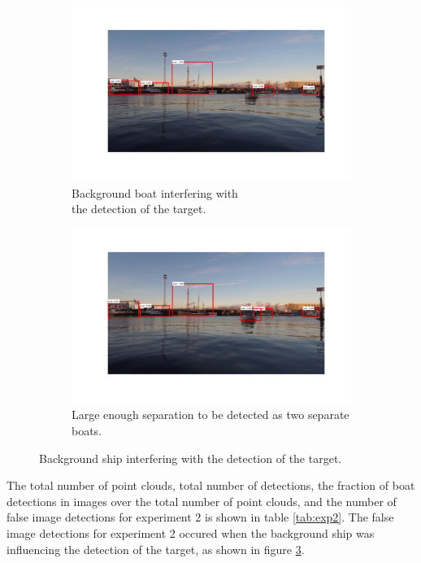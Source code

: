 \begin{figure}[H]
	\centering
	\begin{subfigure}[t]{.5\linewidth}
		\centering
		\includegraphics[width=\linewidth]{fig/exp_2_problem.png}
		\caption{Background boat interfering with\\ the detection of the target.}
		\label{fig:sub_ex2_issue}
	\end{subfigure}%
	\begin{subfigure}[t]{.5\linewidth}
		\centering
		\includegraphics[width=\linewidth]{fig/exp2_past_problem.png}
		\caption{Large enough separation to be detected as two separate boats.}
		\label{fig:sub_ex2_issue2}
	\end{subfigure}
	\caption{Background ship interfering with the detection of the target.}
	\label{fig:issues_ex2}
\end{figure}
The total number of point clouds, total number of detections, the fraction of boat detections in images over the total number of point clouds, and the number of false image detections for experiment 2 is shown in table \ref{tab:exp2}. The false image detections for experiment 2 occured when the background ship was influencing the detection of the target, as shown in figure \ref{fig:issues_ex2}.
